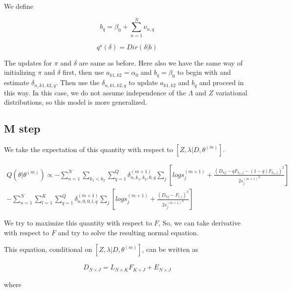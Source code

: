 \documentclass[11pt,authoryear]{article}
\begin{document}
We define 

$$ b_{q} = \beta_0 + \sum_{n=1}^{N} \nu_{n,q} $$

$$ q^{\star} (\delta) = Dir(\delta | b)  $$



The updates for $\pi$ and $\delta$ are same as before. Here also we have the same way of initializing $\pi$ and $\delta$ first, then use $a_{k1,k2}=\alpha_0$ and $b_{q}=\beta_0$ to begin with and estimate $\delta_{n,k1,k2,q}$. Then use the $\delta_{n,k1,k2,q}$ to update $a_{k1,k2}$ and $b_{q}$ and proceed in this way. In this case, we do not assume independence of the $\Lambda$ and $Z$ variational distributions, so this model is more generalized.



\subsection{M step}


%
%
%
%
We take the expectation of this quantity with respect to $\left [ Z, \lambda | D, \theta^{(m)} \right ]$.

\begin{eqnarray}
 Q (\theta | \theta^{(m)}) \propto - \sum_{n=1}^{N} \sum_{k_1 < k_2} \sum_{q=1}^{Q} \delta^{(m+1)}_{n, k_1, k_2, 0, q}  \sum_{j} \left [ log s^{(m+1)}_{j} + \frac{(D_{nj} - q F_{k_1,j} - (1-q) F_{k_2,j})^2}{2{s_j^{(m+1)}}^2} \right] \\
 -   \sum_{n=1}^{N} \sum_{l=1}^{K} \sum_{q=1}^{Q} \delta^{(m+1)}_{n, 0, 0, l, q}  \sum_{j} \left [ log s^{(m+1)}_{j} + \frac{(D_{nj} - F_{l,j})^2}{2{s_j^{(m+1)}}^2} \right] 
\end{eqnarray}

We try to maximize this quantity with respect to $F$, So, we can take derivative with respect to $F$ and try to solve the resulting normal equation.

This equation, conditional on $\left [ Z, \lambda | D, \theta^{(m)} \right ]$, can be written as 

\begin{eqnarray}
 D_{N \times J} = L_{N \times K} F_{K \times J} + E_{N \times J}
\end{eqnarray}

where 
\end{document}
